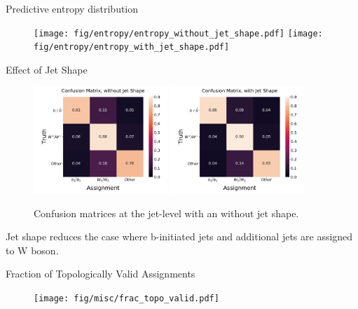 \appendix

\begin{frame}[fragile]{Predictive entropy distribution}
    \begin{figure}
        \centering
        \texttt{[image: fig/entropy/entropy\_without\_jet\_shape.pdf]}
        \texttt{[image: fig/entropy/entropy\_with\_jet\_shape.pdf]}
    \end{figure}
\end{frame}

\begin{frame}[fragile]{Effect of Jet Shape}
    \begin{figure}
        \centering
        \includegraphics[width=0.45\textwidth]{fig/confusion-matrix/confusion_matrix_without_jet_shape.pdf}
        \includegraphics[width=0.45\textwidth]{fig/confusion-matrix/confusion_matrix_with_jet_shape.pdf}
        \caption{Confusion matrices at the jet-level with an without jet shape.}
    \end{figure}
    Jet shape reduces the case where b-initiated jets and additional jets are assigned to W boson.
\end{frame}

\begin{frame}[fragile]{Fraction of Topologically Valid Assignments}
    \begin{figure}
        \centering
        \texttt{[image: fig/misc/frac\_topo\_valid.pdf]}
    \end{figure}
\end{frame}

